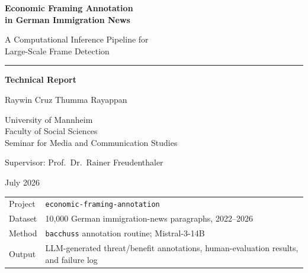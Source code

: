 \documentclass[11pt,a4paper]{article}
\begin{document}
\begin{titlepage}
\thispagestyle{empty}
\centering
\vspace*{1.3cm}

{\Huge\bfseries\color{uniblue} Economic Framing Annotation\\[0.25cm]
in German Immigration News}\par
\vspace{0.9cm}
{\Large\color{uniblue!75!black} A Computational Inference Pipeline for\\
Large-Scale Frame Detection}\par
\vspace{1.2cm}

\rule{0.68\textwidth}{0.6pt}\par
\vspace{0.7cm}
{\large\bfseries Technical Report}\par
\vspace{0.8cm}
{\large Raywin Cruz Thumma Rayappan}\par
\vspace{0.3cm}
{\normalsize University of Mannheim\\
Faculty of Social Sciences\\
Seminar for Media and Communication Studies}\par
\vspace{0.9cm}
{\normalsize Supervisor: Prof.\ Dr.\ Rainer Freudenthaler}\par
\vspace{0.3cm}
{\normalsize July 2026}\par
\vfill

\begin{tabular}{@{}ll@{}}
\toprule
Project & \texttt{economic-framing-annotation} \\
Dataset & 10,000 German immigration-news paragraphs, 2022--2026 \\
Method & \texttt{bacchuss} annotation routine; Mistral-3-14B \\
Output & LLM-generated threat/benefit annotations, human-evaluation results, and failure log \\
\bottomrule
\end{tabular}
\end{titlepage}

\end{document}
